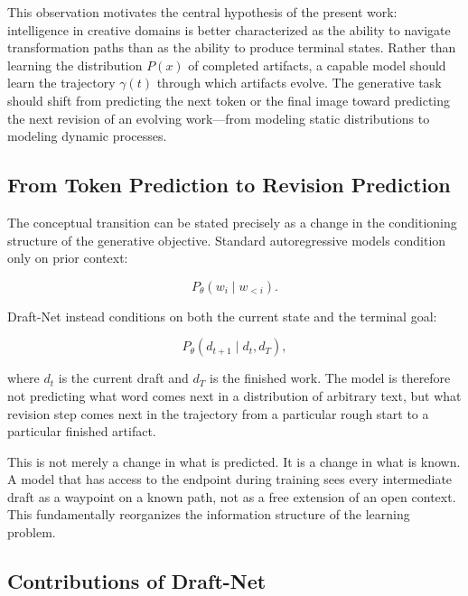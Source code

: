 \documentclass[12pt,a4paper]{article}
\theoremstyle{draftthm}
\newcommand{\traj}{\gamma}
\begin{document}
This observation motivates the central hypothesis of the present work: intelligence in creative domains is better characterized as the ability to navigate transformation paths than as the ability to produce terminal states. Rather than learning the distribution $P(x)$ of completed artifacts, a capable model should learn the trajectory $\traj(t)$ through which artifacts evolve. The generative task should shift from predicting the next token or the final image toward predicting the next revision of an evolving work---from modeling static distributions to modeling dynamic processes.

\subsection{From Token Prediction to Revision Prediction}

The conceptual transition can be stated precisely as a change in the conditioning structure of the generative objective. Standard autoregressive models condition only on prior context:

\begin{equation}
  P_{\theta}(w_i \mid w_{<i}).
\end{equation}

Draft-Net instead conditions on both the current state and the terminal goal:

\begin{equation}
  P_{\theta}(d_{t+1} \mid d_t, d_T),
\end{equation}

where $d_t$ is the current draft and $d_T$ is the finished work. The model is therefore not predicting what word comes next in a distribution of arbitrary text, but what revision step comes next in the trajectory from a particular rough start to a particular finished artifact.

This is not merely a change in what is predicted. It is a change in what is known. A model that has access to the endpoint during training sees every intermediate draft as a waypoint on a known path, not as a free extension of an open context. This fundamentally reorganizes the information structure of the learning problem.

\subsection{Contributions of Draft-Net}
\end{document}
